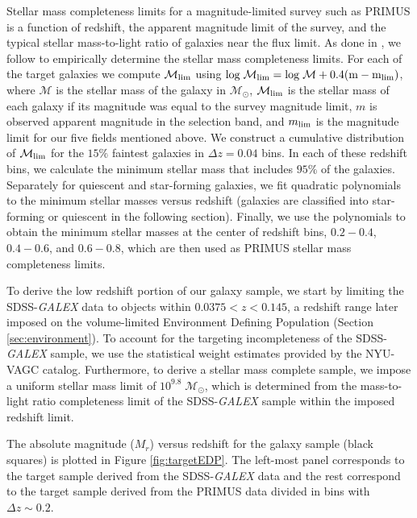 \documentclass{emulateapj}
\begin{document}
Stellar mass completeness limits for a magnitude-limited survey such as PRIMUS is a function of redshift, the apparent magnitude limit of the survey, and the typical stellar mass-to-light ratio of galaxies near the flux limit. As done in \cite{Moustakas:2013aa}, we follow \cite{Pozzetti:2010aa} to empirically determine the stellar mass completeness limits. For each of the target galaxies we compute $\mathcal{M}_{\rm{lim}}$ using $\rm{log} \; \mathcal{M}_{\rm{lim}} = \rm{log} \; \mathcal{M} + 0.4 ( m - m_{\rm{lim}})$, where $\mathcal{M}$ is the stellar mass of the galaxy in $\mathcal{M_{\odot}}$, $\mathcal{M}_{\rm{lim}}$ is the stellar mass of each galaxy if its magnitude was equal to the survey magnitude limit, $m$ is observed apparent magnitude in the selection band, and $m_{\rm{lim}}$ is the magnitude limit for our five fields mentioned above. We construct a cumulative distribution of $\mathcal{M}_{\rm{lim}}$ for the $15\%$ faintest galaxies in $\Delta z=0.04$ bins. In each of these redshift bins, we calculate the minimum stellar mass that includes $95 \%$ of the galaxies. Separately for quiescent and star-forming galaxies, we fit quadratic polynomials to the minimum stellar masses versus redshift (galaxies are classified into star-forming or quiescent in the following section). Finally, we use the polynomials to obtain the minimum stellar masses at the center of redshift bins, $0.2-0.4$, $0.4-0.6$, and $0.6-0.8$, which are then used as PRIMUS stellar mass completeness limits.

To derive the low redshift portion of our galaxy sample, we start by limiting the SDSS-{\em GALEX} data to objects within $0.0375 < z < 0.145$, a redshift range later imposed on the volume-limited Environment Defining Population (Section \ref{sec:environment}). To account for the targeting incompleteness of the SDSS-{\em GALEX} sample, we use the statistical weight estimates provided by the NYU-VAGC catalog. Furthermore, to derive a stellar mass complete sample, we impose a uniform stellar mass limit of $10^9.8 \; \mathcal{M}_{\odot}$, which is determined from the mass-to-light ratio completeness limit of the SDSS-{\em GALEX} sample within the imposed redshift limit. 

The absolute magnitude ($M_{r}$) versus redshift for the galaxy sample (black squares) is plotted in Figure \ref{fig:targetEDP}. The left-most panel corresponds to the target sample derived from the SDSS-{\em GALEX} data and the rest correspond to the target sample derived from the PRIMUS data divided in bins with $\Delta z \sim 0.2$. 
\end{document}
